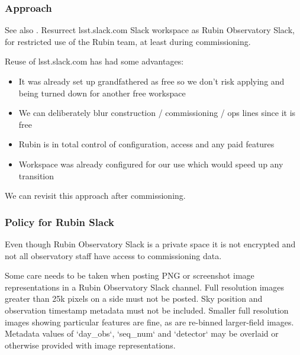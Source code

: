 \subsubsection{Approach}
See also .
Resurrect lsst.slack.com Slack workspace as Rubin Observatory Slack, for restricted use of the Rubin team, at least during commissioning.

Reuse of lsst.slack.com has had some advantages:

\begin{itemize}
\item  It was already set up grandfathered as free so we don't risk applying and being turned down for another free workspace
\item  We can deliberately blur construction / commissioning / ops lines since it is free
\item  Rubin is in total control of configuration, access and any paid features
\item  Workspace was already configured for our use which would speed up any transition

\end{itemize}
We can revisit this approach after commissioning.

\subsubsection{Policy for Rubin Slack}

Even though Rubin Observatory Slack is a private space it is not encrypted and not all observatory staff have access to commissioning data.

Some care needs to be taken when posting PNG or screenshot image representations in a Rubin Observatory Slack channel.
Full resolution images greater than 25k pixels on a side must not be posted.
Sky position and observation timestamp metadata must not be included.
Smaller full resolution images showing particular features are fine, as are re-binned larger-field images.
Metadata values of `day\_obs`, `seq\_num` and `detector` may be overlaid or otherwise provided with image representations.
